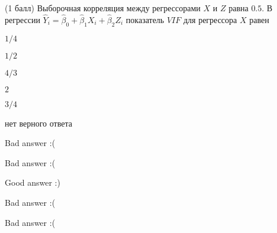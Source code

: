 
\begin{question}
(1 балл) Выборочная корреляция между регрессорами \(X\) и \(Z\) равна \(0.5\). В
регрессии \(\hat Y_i = \hat\beta_0 + \hat\beta_1 X_i + \hat\beta_2 Z_i\)
показатель \(VIF\) для регрессора \(X\) равен
\begin{answerlist}
  \item \(1/4\)
  \item \(1/2\)
  \item \(4/3\)
  \item \(2\)
  \item \(3/4\)
  \item нет верного ответа
\end{answerlist}
\end{question}

\begin{solution}
\begin{answerlist}
  \item Bad answer :(
  \item Bad answer :(
  \item Good answer :)
  \item Bad answer :(
  \item Bad answer :(
\end{answerlist}
\end{solution}
